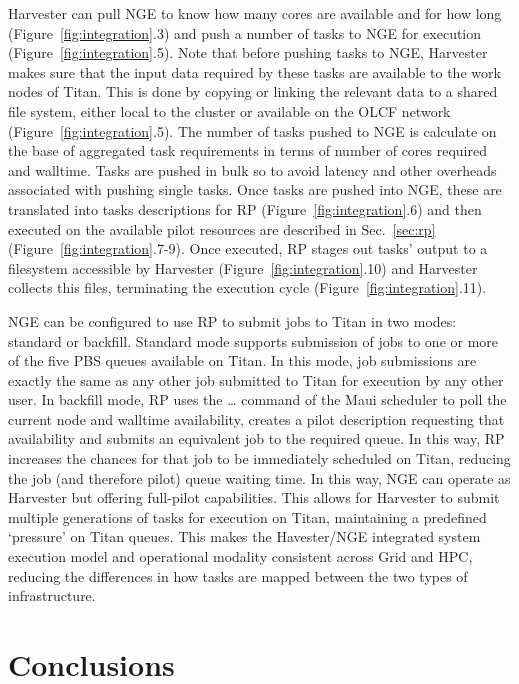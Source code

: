 \documentclass{webofc}
\begin{document}
Harvester can pull NGE to know how many cores are available and for how long (Figure~\ref{fig:integration}.3) and push a number of tasks to NGE for execution (Figure~\ref{fig:integration}.5). Note that before pushing tasks to NGE, Harvester makes sure that the input data required by these tasks are available to the work nodes of Titan. This is done by copying or linking the relevant data to a shared file system, either local to the cluster or available on the OLCF network (Figure~\ref{fig:integration}.5).  The number of tasks pushed to NGE is calculate on the base of aggregated task requirements in terms of number of cores required and walltime. Tasks are pushed in bulk so to avoid latency and other overheads associated with pushing single tasks. Once tasks are pushed into NGE, these are translated into tasks descriptions for RP (Figure~\ref{fig:integration}.6) and then executed on the available pilot resources are described in Sec.~\ref{sec:rp} (Figure~\ref{fig:integration}.7-9). Once executed, RP stages out tasks’ output to a filesystem accessible by Harvester (Figure~\ref{fig:integration}.10) and Harvester collects this files, terminating the execution cycle (Figure~\ref{fig:integration}.11).

NGE can be configured to use RP to submit jobs to Titan in two modes: standard or backfill. Standard mode supports submission of jobs to one or more of the five PBS queues available on Titan. In this mode, job submissions are exactly the same as any other job submitted to Titan for execution by any other user. In backfill mode, RP uses the … command of the Maui scheduler to poll the current node and walltime availability, creates a pilot description requesting that availability and submits an equivalent job to the required queue. In this way, RP increases the chances for that job to be immediately scheduled on Titan, reducing the job (and therefore pilot) queue waiting time. In this way, NGE can operate as Harvester but offering full-pilot capabilities. This allows for Harvester to submit multiple generations of tasks for execution on Titan, maintaining a predefined ‘pressure’ on Titan queues. This makes the Havester/NGE integrated system execution model and operational modality consistent across Grid and HPC, reducing the differences in how tasks are mapped between the two types of infrastructure.

\section{Conclusions}
\end{document}
